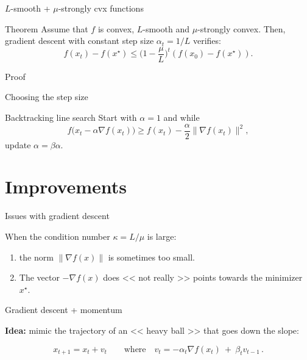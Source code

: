 \documentclass{beamer}
\begin{document}
\begin{frame}[t]{$L$-smooth + $\mu$-strongly cvx functions}
	\grid

	\vspace{-0.4cm}
	\begin{block}{Theorem}
		Assume that $f$ is convex, $L$-smooth and $\mu$-strongly convex.
		Then, gradient descent with constant step size $\alpha_t = 1/L$ verifies:
		$$
		f(x_t) - f(x^{\star}) \leq \Big(1 - \frac{\mu}{L} \Big)^t (f(x_0) - f(x^{\star})).
		$$
	\end{block}
\end{frame}

\begin{frame}[t]{Proof}
	\grid

\end{frame}


\begin{frame}[t]{Choosing the step size}
	\grid

	\begin{block}{Backtracking line search}
		Start with $\alpha = 1$ and while
		$$
		f\big(x_t - \alpha \nabla f(x_t) \big) \geq f(x_t) - \frac{\alpha}{2} \|\nabla f(x_t) \|^2,
		$$
		update $\alpha = \beta \alpha$.
	\end{block}
\end{frame}



\section{Improvements}


\begin{frame}[t]{Issues with gradient descent}
	\grid

	When the condition number $\kappa = L / \mu$ is large:
	\vspace{0.2cm}
	\begin{enumerate}
		\item the norm $ \|\nabla f(x) \|$ is sometimes too small.
		\item The vector $- \nabla f(x)$ does << not really >> points towards the minimizer $x^{\star}$.
	\end{enumerate}

\end{frame}

\begin{frame}[t]{Gradient descent + momentum}
	\grid

	\textbf{Idea:} mimic the trajectory of an << heavy ball >> that goes down the slope:
	\vspace{-0.3cm}
	\begin{exampleblock}{}
		\vspace{-0.3cm}
		$$
		x_{t+1} = x_t + v_t \qquad \text{where} \quad v_t = - \alpha_t \nabla f(x_t)  \ + \ \beta_t v_{t-1} \,.
		$$
	\end{exampleblock}

\end{frame}
\end{document}
